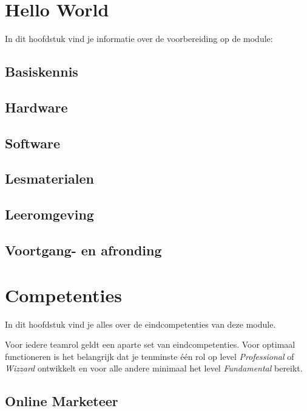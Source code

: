 \documentclass[]{book}
\begin{document}
\chapter{Hello World}\label{hello-world}

In dit hoofdstuk vind je informatie over de voorbereiding op de module:

\section{Basiskennis}\label{basiskennis}

\section{Hardware}\label{hardware}

\section{Software}\label{software}

\section{Lesmaterialen}\label{lesmaterialen}

\section{Leeromgeving}\label{leeromgeving}

\section{Voortgang- en afronding}\label{voortgang--en-afronding}

\chapter{Competenties}\label{competenties}

In dit hoofdstuk vind je alles over de eindcompetenties van deze module.

Voor iedere teamrol geldt een aparte set van eindcompetenties. Voor
optimaal functioneren is het belangrijk dat je tenminste één rol op
level \emph{Professional} of \emph{Wizzard} ontwikkelt en voor alle
andere minimaal het level \emph{Fundamental} bereikt.

\section{Online Marketeer}\label{online-marketeer}
\end{document}
